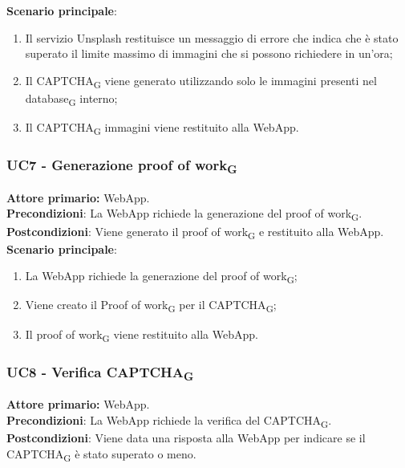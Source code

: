 \textbf{Scenario principale}:
\begin{enumerate}
    \item Il servizio Unsplash restituisce un messaggio di errore che indica che è stato superato il limite massimo di immagini che si possono richiedere in un'ora;
    \item Il CAPTCHA\textsubscript{G} viene generato utilizzando solo le immagini presenti nel database\textsubscript{G} interno;
    \item Il CAPTCHA\textsubscript{G} immagini viene restituito alla WebApp.
\end{enumerate}

\subsubsection{UC7  - Generazione proof of work\textsubscript{G}}
\textbf{Attore primario:} WebApp.\\
\textbf{Precondizioni}: La WebApp richiede la generazione del proof of work\textsubscript{G}.\\
\textbf{Postcondizioni}: Viene generato il proof of work\textsubscript{G} e restituito alla WebApp.\\

\textbf{Scenario principale}:
\begin{enumerate}
    \item La WebApp richiede la generazione del proof of work\textsubscript{G};
    \item Viene creato il Proof of work\textsubscript{G} per il CAPTCHA\textsubscript{G};
    \item Il proof of work\textsubscript{G} viene restituito alla WebApp.
\end{enumerate}

\subsubsection{UC8 - Verifica CAPTCHA\textsubscript{G}}
\textbf{Attore primario:} WebApp.\\
\textbf{Precondizioni}: La WebApp richiede la verifica 
 del CAPTCHA\textsubscript{G}.\\
\textbf{Postcondizioni}: Viene data una risposta alla WebApp per indicare se il CAPTCHA\textsubscript{G} è stato superato o meno.\\

